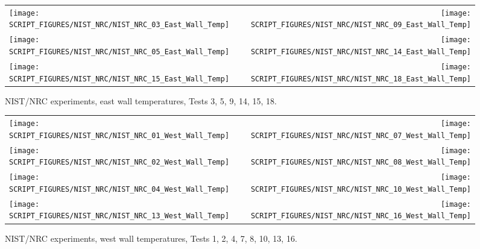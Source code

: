 \begin{figure}[p]
\begin{tabular*}{\textwidth}{l@{\extracolsep{\fill}}r}
\texttt{[image: SCRIPT\_FIGURES/NIST\_NRC/NIST\_NRC\_03\_East\_Wall\_Temp]} &
\texttt{[image: SCRIPT\_FIGURES/NIST\_NRC/NIST\_NRC\_09\_East\_Wall\_Temp]} \\
\texttt{[image: SCRIPT\_FIGURES/NIST\_NRC/NIST\_NRC\_05\_East\_Wall\_Temp]} &
\texttt{[image: SCRIPT\_FIGURES/NIST\_NRC/NIST\_NRC\_14\_East\_Wall\_Temp]} \\
\texttt{[image: SCRIPT\_FIGURES/NIST\_NRC/NIST\_NRC\_15\_East\_Wall\_Temp]} &
\texttt{[image: SCRIPT\_FIGURES/NIST\_NRC/NIST\_NRC\_18\_East\_Wall\_Temp]}
\end{tabular*}
\caption[NIST/NRC experiments, east wall temperatures, Tests 3, 5, 9, 14, 15, 18]{NIST/NRC experiments, east wall temperatures, Tests 3, 5, 9, 14, 15, 18.}
\label{NIST_NRC_East_Wall_Temp_Open}
\end{figure}

\begin{figure}[p]
\begin{tabular*}{\textwidth}{l@{\extracolsep{\fill}}r}
\texttt{[image: SCRIPT\_FIGURES/NIST\_NRC/NIST\_NRC\_01\_West\_Wall\_Temp]} &
\texttt{[image: SCRIPT\_FIGURES/NIST\_NRC/NIST\_NRC\_07\_West\_Wall\_Temp]} \\
\texttt{[image: SCRIPT\_FIGURES/NIST\_NRC/NIST\_NRC\_02\_West\_Wall\_Temp]} &
\texttt{[image: SCRIPT\_FIGURES/NIST\_NRC/NIST\_NRC\_08\_West\_Wall\_Temp]} \\
\texttt{[image: SCRIPT\_FIGURES/NIST\_NRC/NIST\_NRC\_04\_West\_Wall\_Temp]} &
\texttt{[image: SCRIPT\_FIGURES/NIST\_NRC/NIST\_NRC\_10\_West\_Wall\_Temp]} \\
\texttt{[image: SCRIPT\_FIGURES/NIST\_NRC/NIST\_NRC\_13\_West\_Wall\_Temp]} &
\texttt{[image: SCRIPT\_FIGURES/NIST\_NRC/NIST\_NRC\_16\_West\_Wall\_Temp]}
\end{tabular*}
\caption[NIST/NRC experiments, west wall temperatures, Tests 1, 2, 4, 7, 8, 10, 13, 16]{NIST/NRC experiments, west wall temperatures, Tests 1, 2, 4, 7, 8, 10, 13, 16.}
\label{NIST_NRC_West_Wall_Temp_Closed}
\end{figure}

